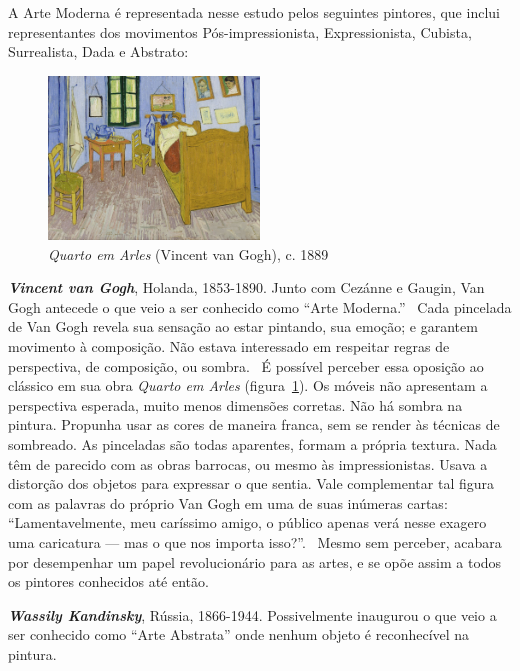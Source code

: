A Arte Moderna é representada nesse estudo pelos seguintes pintores,
que inclui representantes dos movimentos Pós-impressionista,
Expressionista, Cubista, Surrealista, Dada e Abstrato:

\begin{figure}
  \vspace{-15pt}
  \begin{centering}
    \caption{\emph{Quarto em Arles} (Vincent van Gogh), c. 1889}
    \label{fig:vangogh:quarto}
    \includegraphics[width=0.5\textwidth]{figs/vangogh_quarto.png}
  \end{centering}
\end{figure}

\textbf{\emph{Vincent van Gogh}}, Holanda, 1853-1890. Junto com
Cezánne e Gaugin, Van Gogh antecede o que veio a ser conhecido como
``Arte Moderna.''~\cite{gombrich} Cada pincelada de Van Gogh revela
sua sensação ao estar pintando, sua emoção; e garantem movimento à
composição. Não estava interessado em respeitar regras de perspectiva,
de composição, ou sombra.~\cite{hulsker} É possível perceber essa
oposição ao clássico em sua obra \textit{Quarto em Arles}
(figura~\ref{fig:vangogh:quarto}). Os móveis não apresentam
a perspectiva esperada, muito menos dimensões corretas. Não há sombra na
pintura. Propunha usar as cores de maneira franca, sem se render às
técnicas de sombreado. As pinceladas são todas aparentes, formam a
própria textura. Nada têm de parecido com as obras barrocas, ou mesmo
às impressionistas. Usava a distorção dos objetos para expressar o que
sentia. Vale complementar tal figura com as palavras do próprio Van
Gogh em uma de suas inúmeras cartas: ``Lamentavelmente, meu caríssimo
amigo, o público apenas verá nesse exagero uma caricatura --- mas o
que nos importa isso?''.~\cite{van1958} Mesmo sem perceber, acabara
por desempenhar um papel revolucionário para as artes, e se opõe assim
a todos os pintores conhecidos até então.

\textbf{\emph{Wassily Kandinsky}}, Rússia, 1866-1944. Possivelmente
inaugurou o que veio a ser conhecido como ``Arte Abstrata'' onde
nenhum objeto é reconhecível na pintura.~\cite{duchting} 

